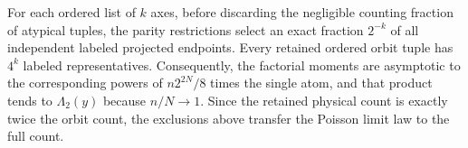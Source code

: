 For each ordered list of \(k\) axes, before discarding the negligible counting fraction of atypical tuples, the parity restrictions select an exact fraction \(2^{-k}\) of all independent labeled projected endpoints. Every retained ordered orbit tuple has \(4^k\) labeled representatives. Consequently, the factorial moments are asymptotic to the corresponding powers of \(n2^{2N}/8\) times the single atom, and that product tends to \(\Lambda_2(y)\) because \(n/N\to1\). Since the retained physical count is exactly twice the orbit count, the exclusions above transfer the Poisson limit law to the full count.
